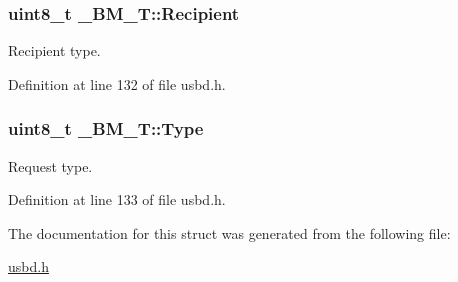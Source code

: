 \subsubsection[{\texorpdfstring{Recipient}{Recipient}}]{\setlength{\rightskip}{0pt plus 5cm}uint8\+\_\+t \+\_\+\+B\+M\+\_\+\+T\+::\+Recipient}\hypertarget{struct__BM__T_a94927112fe5f66edfe58f7b357619128}{}\label{struct__BM__T_a94927112fe5f66edfe58f7b357619128}
Recipient type. 

Definition at line 132 of file usbd.\+h.

\subsubsection[{\texorpdfstring{Type}{Type}}]{\setlength{\rightskip}{0pt plus 5cm}uint8\+\_\+t \+\_\+\+B\+M\+\_\+\+T\+::\+Type}\hypertarget{struct__BM__T_a5fd0780bac15d2e87e04493d68941415}{}\label{struct__BM__T_a5fd0780bac15d2e87e04493d68941415}
Request type. 

Definition at line 133 of file usbd.\+h.



The documentation for this struct was generated from the following file\+:\begin{DoxyCompactItemize}
\item 
\hyperlink{usbd_8h}{usbd.\+h}\end{DoxyCompactItemize}
